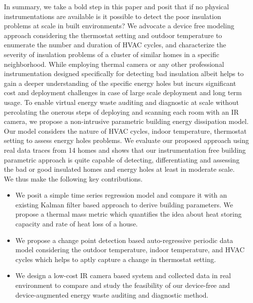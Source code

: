 \documentclass{sig-alternate}
\begin{document}
 
In summary, we take a bold step in this paper and posit that if no physical instrumentations are available is it possible to detect the poor insulation problems at scale in built environments? We advocate a device free modeling approach considering the thermostat setting and outdoor temperature to enumerate the number and duration of HVAC cycles, and characterize the severity of insulation problems of a cluster of similar homes in a specific neighborhood. While employing thermal camera or any other professional instrumentation designed specifically for detecting bad insulation albeit helps to gain a deeper understanding of the specific energy holes but incurs significant cost and deployment challenges in case of large scale deployment and long term usage. To enable virtual energy waste auditing and diagnostic at scale without percolating the onerous steps of deploying and scanning each room with an IR camera, we propose a non-intrusive parametric building energy dissipation model. Our model considers the nature of HVAC cycles, indoor temperature, thermostat setting to assess energy holes problems. We evaluate our proposed approach using real data traces from 14 homes and shows that our instrumentation free building parametric approach is quite capable of detecting, differentiating and assessing the bad or good insulated homes and energy holes at least in moderate scale.\\
 We thus make the following key contributions.
\begin{itemize}
\item We posit a simple time series regression model and compare it with an existing Kalman filter based approach to derive building parameters. We propose a thermal mass metric which quantifies the idea about heat storing capacity and rate of heat loss of a house. 
\item We propose a change point detection based auto-regressive periodic data model considering the outdoor temperature, indoor temperature, and HVAC cycles which helps to aptly capture a change in thermostat setting.
\item We design a low-cost IR camera based system and collected data in real environment to compare and study the feasibility of our device-free and device-augmented energy waste auditing and diagnostic method.
\end{itemize}

	

	
	
	
	
\end{document}
